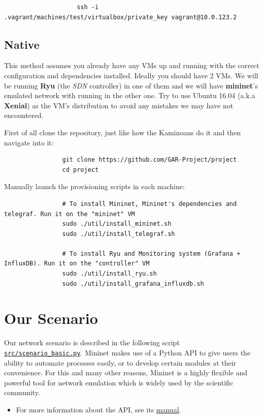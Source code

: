 \documentclass[12pt]{report}
\begin{document}
				\begin{verbatim}
					ssh -i .vagrant/machines/test/virtualbox/private_key vagrant@10.0.123.2
				\end{verbatim}

		\subsection{Native}
			This method assumes you already have any VMs up and running with the correct configuration and dependencies installed. Ideally you should have 2 VMs. We will be running \textbf{Ryu} (the \textit{SDN} controller) in one of them and we will have \textbf{mininet}'s emulated network with running in the other one. Try to use Ubuntu 16.04 (a.k.a \textbf{Xenial}) as the VM's distribution to avoid any mistakes we may have not encountered.

			First of all clone the repository, just like how the Kaminoans do it and then navigate into it:

			\begin{verbatim}
				git clone https://github.com/GAR-Project/project
				cd project
			\end{verbatim}

			Manually launch the provisioning scripts in each machine:

			\begin{verbatim}
				# To install Mininet, Mininet's dependencies and telegraf. Run it on the "mininet" VM
				sudo ./util/install_mininet.sh
				sudo ./util/install_telegraf.sh

				# To install Ryu and Monitoring system (Grafana + InfluxDB). Run it on the "controller" VM
				sudo ./util/install_ryu.sh
				sudo ./util/install_grafana_influxdb.sh
			\end{verbatim}

	\section{Our Scenario}
		Our network scenario is described in the following script \href{https://github.com/GAR-Project/project/blob/master/src/scenario_basic.py}{\texttt{src/scenario\_basic.py}}. Mininet makes use of a Python API to give users the ability to automate processes easily, or to develop certain modules at their convenience. For this and many other reasons, Mininet is a highly flexible and powerful tool for network emulation which is widely used by the scientific community.

		\begin{itemize}
			\item For more information about the API, see its \href{http://mininet.org/api/annotated.html}{manual}.
		\end{itemize}
\end{document}
